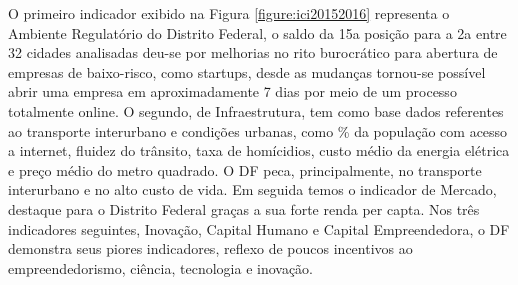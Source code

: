 O primeiro indicador exibido na Figura \ref{figure:ici20152016} representa o Ambiente Regulatório do Distrito Federal, o saldo da 15a posição para a 2a entre 32 cidades analisadas deu-se por melhorias no rito burocrático para abertura de empresas de baixo-risco, como startups, desde as mudanças tornou-se possível abrir uma empresa em aproximadamente 7 dias por meio de um processo totalmente online. O segundo, de Infraestrutura, tem como base dados referentes ao transporte interurbano e condições urbanas, como \% da população com acesso a internet, fluidez do trânsito, taxa de homícidios, custo médio da energia elétrica e preço médio do metro quadrado. O DF peca, principalmente, no transporte interurbano e no alto custo de vida. Em seguida temos o indicador de Mercado, destaque para o Distrito Federal graças a sua forte renda per capta. Nos três indicadores seguintes, Inovação, Capital Humano e Capital Empreendedora, o DF demonstra seus piores indicadores, reflexo de poucos incentivos ao empreendedorismo, ciência, tecnologia e inovação.